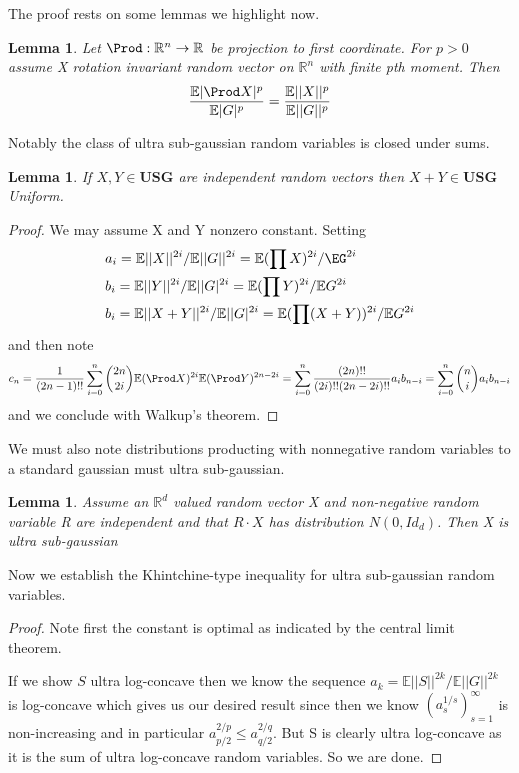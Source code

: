 \documentclass[10pt]{article}
\newcommand{\E}{\mathbb{E}}
\newcommand{\1}{\textbf{1}}
\newcommand{\R}{\mathbb{R}}
\newtheorem{lemma}[theorem]{Lemma}
\theoremstyle{remark}
\theoremstyle{definition}
\begin{document}
The proof rests on some lemmas we highlight now.

\begin{lemma}
	Let $\Prod: \R^n \to \R$ be projection to first coordinate. For $p > 0$ assume X rotation invariant random vector on $\R^n$ with finite pth moment. Then
	\begin{align*}
		\frac{\E|\Prod X|^p}{\E |G|^p} = \frac{\E||X||^p}{\E||G||^p}
	\end{align*}
\end{lemma}

Notably the class of ultra sub-gaussian random variables is closed under sums.

\begin{lemma}
	If $X,Y \in \textbf{USG}$ are independent random vectors then $X+Y \in \textbf{USG}$Uniform.
\end{lemma}

\begin{proof}
	We may assume X and Y nonzero constant. Setting
	\begin{align*}
		&a_i = \E||X||^{2i}/\E||G||^{2i} = \E(\prod X)^{2i}/\EG^{2i}\\
		&b_i = \E||Y||^{2i}/\E||G|^{2i} = \E(\prod Y)^{2i}/\E G^{2i}\\
		&b_i = \E||X+Y||^{2i}/\E||G|^{2i} = \E(\prod (X+Y))^{2i}/\E G^{2i}
	\end{align*}
	and then note
	\begin{align*}
		c_n  = \frac{1}{(2n-1)!!}\sum_{i=0}^{n}{2n \choose 2i} \E(\Prod X)^{2i} \E(\Prod Y)^{2n - 2i} = \sum_{i=0}^n \frac{(2n)!!}{(2i)!!(2n-2i)!!}a_ib_{n-i} = \sum_{i=0}^n {n \choose i}a_i b_{n-i}
	\end{align*}
	and we conclude with Walkup's theorem.
\end{proof}

We must also note distributions producting with nonnegative random variables to a standard gaussian must ultra sub-gaussian.

\begin{lemma}
	Assume an $\R^d$ valued random vector X and non-negative random variable R are independent and that $R \cdot X$ has distribution $N(0,I d_d)$. Then X is ultra sub-gaussian
\end{lemma}

Now we establish the Khintchine-type inequality for ultra sub-gaussian random variables.

\begin{proof}
	Note first the constant is optimal as indicated by the central limit theorem.

	If we show $S$ ultra log-concave then we know the sequence $a_k = \E||S||^{2k}/\E||G||^{2k}$ is log-concave which gives us our desired result since then we know $(a_s^{1/s})_{s=1}^{\infty}$ is non-increasing and in particular $a_{p/2}^{2/p} \leq a_{q/2}^{2/q}$. But S is clearly ultra log-concave as it is the sum of ultra log-concave random variables. So we are done.
\end{proof}
\end{document}
